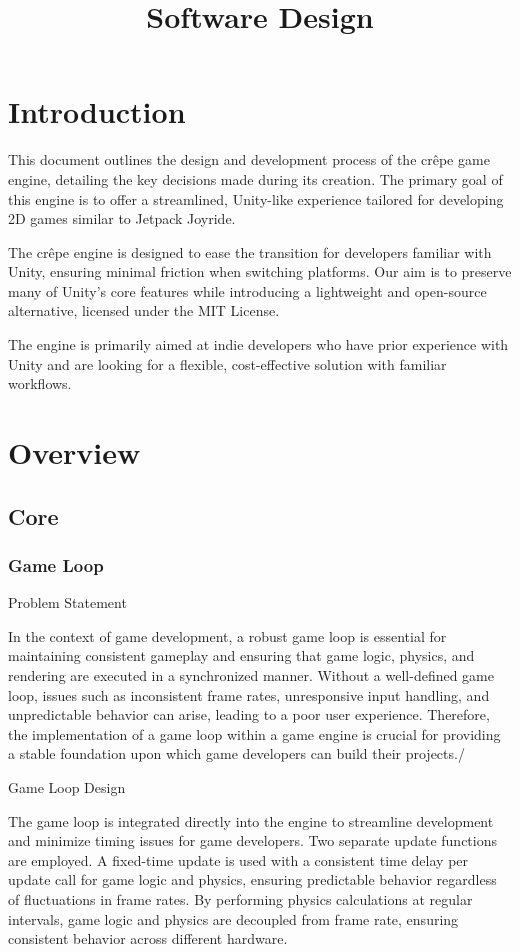 \documentclass{projdoc}
\title{Software Design}
\begin{document}
\tablestables
\newpage

\section{Introduction}

This document outlines the design and development process of the cr\^epe game engine,
detailing the key decisions made during its creation. The primary goal of this engine
is to offer a streamlined, Unity-like experience tailored for developing 2D games
similar to Jetpack Joyride.

The cr\^epe engine is designed to ease the transition for developers familiar with
Unity, ensuring minimal friction when switching platforms. Our aim is to preserve
many of Unity’s core features while introducing a lightweight and open-source
alternative, licensed under the MIT License.

The engine is primarily aimed at indie developers who have prior experience with
Unity and are looking for a flexible, cost-effective solution with familiar
workflows.

\section{Overview}

\subsection{Core}
\subsubsection{Game Loop}
Problem Statement\

In the context of game development, a robust game loop is essential for maintaining consistent gameplay and ensuring that game logic, physics, and rendering are executed in a synchronized manner.
Without a well-defined game loop, issues such as inconsistent frame rates, unresponsive input handling, and unpredictable behavior can arise, leading to a poor user experience.
Therefore, the implementation of a game loop within a game engine is crucial for providing a stable foundation upon which game developers can build their projects./

Game Loop Design\

The game loop is integrated directly into the engine to streamline development and minimize timing issues for game developers.
Two separate update functions are employed. A fixed-time update is used with a consistent time delay per update call for game logic and physics, ensuring predictable behavior regardless of fluctuations in frame rates.
By performing physics calculations at regular intervals, game logic and physics are decoupled from frame rate, ensuring consistent behavior across different hardware.
\end{document}
